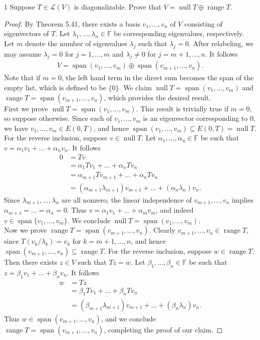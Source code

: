 \documentclass{extarticle}
\newenvironment{problem}[1]{\begin{prob*}{#1}{}}{\end{prob*}}
\newcommand{\F}{\mathbb{F}}
\DeclareMathOperator{\Span}{span}
\newcommand{\Hom}{\mathcal{L}}
\DeclareMathOperator{\Null}{null}
\DeclareMathOperator{\Range}{range}
\begin{document}
\begin{problem}{1}
Suppose $T\in\Hom(V)$ is diagonalizable.  Prove that $V = \Null T\oplus\Range T$.
\end{problem}
\begin{proof}
By Theorem 5.41, there exists a basis $v_1,\dots, v_n$ of $V$ consisting of eigenvectors of $T$.  Let $\lambda_1,\dots, \lambda_n\in\F$ be corresponding eigenvalues, respectively.   Let $m$ denote the number of eigenvalues $\lambda_j$ such that $\lambda_j = 0$.  After relabeling, we may assume $\lambda_j = 0$ for $j=1,\dots, m$ and $\lambda_j \neq 0$ for $j = m+1,\dots,n$.  It follows
\begin{align*}
V = \Span(v_1,\dots, v_m)\oplus \Span(v_{m+1},\dots,v_n).
\end{align*}
Note that if $m = 0$, the left hand term in the direct sum becomes the span of the empty list, which is defined to be $\{0\}$.  We claim $\Null T =  \Span(v_1,\dots, v_m)$ and $\Range T = \Span(v_{m+1},\dots,v_n)$, which provides the desired result.\\
\indent First we prove $\Null T = \Span(v_1,\dots, v_m)$.  This result is trivially true if $m=0$, so suppose otherwise.  Since each of $v_1,\dots,v_m$ is an eigenvector corresponding to $0$, we have $v_1,\dots,v_m\in E(0,T)$, and hence $\Span(v_1,\dots,v_m)\subseteq E(0, T)=\Null T$.  For the reverse inclusion, suppose $v\in \Null T$.  Let $\alpha_1,\dots,\alpha_n\in\F$ be such that $v = \alpha_1v_1 + \dots + \alpha_nv_n$.  It follows
\begin{align*}
0 &= Tv\\
&= \alpha_1Tv_1 + \dots + \alpha_nTv_n\\
&= \alpha_{m+1}Tv_{m+1} + \dots + \alpha_nTv_n\\
&= (\alpha_{m+1}\lambda_{m+1})v_{m+1} + \dots + (\alpha_n\lambda_n) v_n.
\end{align*}
Since $\lambda_{m+1},\dots, \lambda_{n}$ are all nonzero, the linear independence of $v_{m+1},\dots, v_{n}$ implies $\alpha_{m+1} = \dots = \alpha_n = 0$.  Thus $v = \alpha_1v_1 + \dots + \alpha_mv_m$, and indeed $v\in\Span\{v_1,\dots,v_m\}$.  We conclude $\Null T = \Span(v_1,\dots, v_m)$.\\
\indent Now we prove $\Range T = \Span(v_{m+1},\dots, v_n)$.  Clearly $v_{m+1},\dots,v_n\in\Range T$, since $T(v_k/\lambda_k) = v_k$ for $k = m+1,\dots, n$, and hence $\Span(v_{m+1},\dots, v_n)\subseteq \Range T$.  For the reverse inclusion, suppose $w\in \Range T$.  Then there exists $z\in V$ such that $Tz = w$.  Let $\beta_1,\dots,\beta_n\in\F$ be such that $z = \beta_1v_1 + \dots + \beta_nv_n$.  It follows
\begin{align*}
w &= Tz\\
&= \beta_1Tv_1 + \dots + \beta_nTv_n\\
&= (\beta_{m+1}\lambda_{m+1})v_{m+1} + \dots + (\beta_n\lambda_n)v_n.
\end{align*}
Thus $w\in \Span(v_{m+1},\dots,v_n)$, and we conclude $\Range T = \Span(v_{m+1},\dots,v_n)$, completing the proof of our claim.
\end{proof}
\end{document}
